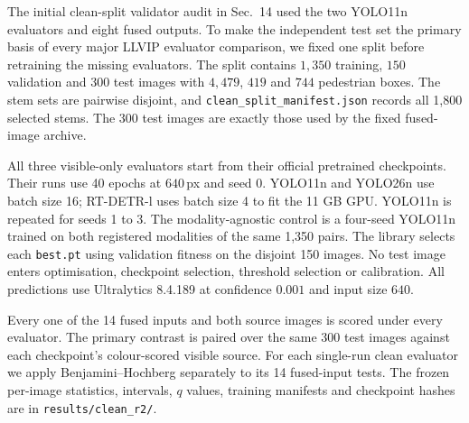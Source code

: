 \documentclass[preprint,12pt,a4paper]{elsarticle}
\begin{document}
The initial clean-split validator audit in Sec.~14 used the two YOLO11n evaluators and
eight fused outputs. To make the independent test set the primary basis of every major
LLVIP evaluator comparison, we fixed one split before retraining the missing
evaluators. The split contains $1{,}350$ training, $150$ validation and $300$ test
images with $4{,}479$, $419$ and $744$ pedestrian boxes. The stem sets are pairwise
disjoint, and \texttt{clean\_split\_manifest.json} records all 1,800 selected stems.
The 300 test images are exactly those used by the fixed fused-image archive.

All three visible-only evaluators start from their official pretrained checkpoints.
Their runs use 40 epochs at $640$\,px and seed 0. YOLO11n and YOLO26n use batch size 16;
RT-DETR-l uses batch size 4 to fit the 11 GB GPU. YOLO11n is repeated for seeds 1 to 3.
The modality-agnostic control is a four-seed YOLO11n trained on both registered
modalities of the same 1,350 pairs. The library selects each \texttt{best.pt} using
validation fitness on the disjoint 150 images. No test image enters optimisation,
checkpoint selection, threshold selection or calibration. All predictions use
Ultralytics 8.4.189 at confidence $0.001$ and input size $640$.

Every one of the 14 fused inputs and both source images is scored under every
evaluator. The primary contrast is paired over the same 300 test images against each
checkpoint's colour-scored visible source. For each single-run clean evaluator we apply
Benjamini--Hochberg separately to its 14 fused-input tests. The frozen per-image
statistics, intervals, $q$ values, training manifests and checkpoint hashes are in
\texttt{results/clean\_r2/}.
\end{document}

